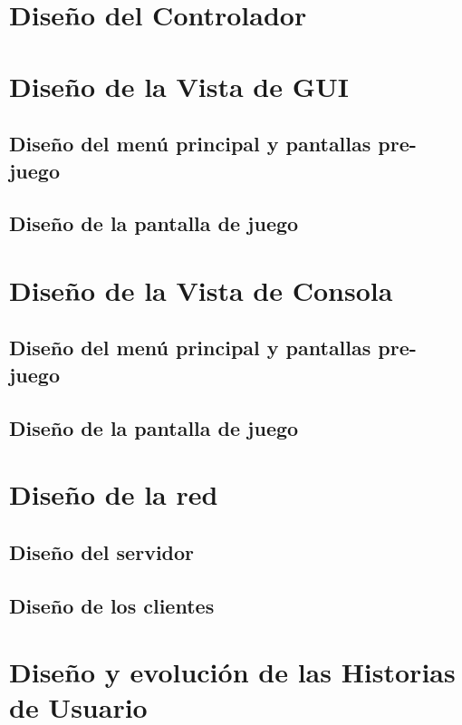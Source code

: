 \documentclass{article}
\theoremstyle{break}
\begin{document}
\section{Diseño del Controlador}


\section{Diseño de la Vista de GUI}

\subsection{Diseño del menú principal y pantallas pre-juego}

\subsection{Diseño de la pantalla de juego}


\section{Diseño de la Vista de Consola}

\subsection{Diseño del menú principal y pantallas pre-juego}

\subsection{Diseño de la pantalla de juego}


\section{Diseño de la red}

\subsection{Diseño del servidor}

\subsection{Diseño de los clientes}


\section{Diseño y evolución de las Historias de Usuario}
\end{document}
